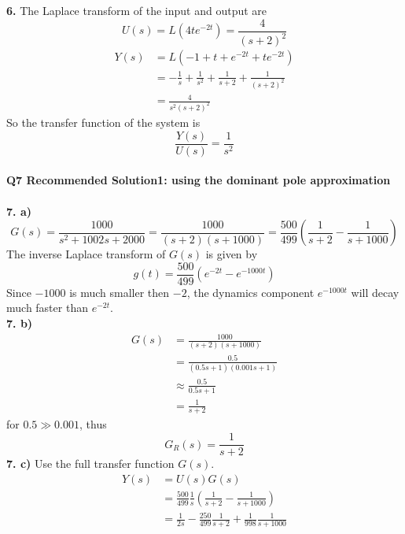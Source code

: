 \documentclass[11pt, a4paper]{article}
\begin{document}
\\
\\
\textbf{6.} The Laplace transform of the input and output are 
\begin{equation*}
U(s) = L(4te^{-2t}) = \frac{4}{(s+2)^2} 
\end{equation*}
\begin{equation*}
\begin{split}
Y(s) &= L(-1 + t + e^{-2t} + te^{-2t})\\
     &= -\frac{1}{s} + \frac{1}{s^2} + \frac{1}{s+2} + \frac{1}{(s+2)^2}\\
     &= \frac{4}{s^2(s+2)^2}
\end{split}
\end{equation*}
So the transfer function of the system is 
\begin{equation*}
\frac{Y(s)}{U(s)} = \frac{1}{s^2}
\end{equation*}
\\
\textbf{Q7 Recommended Solution1: using the dominant pole approximation}\\
\\
\textbf{7. a)}
\begin{equation*}
G(s) = \frac{1000}{s^2 + 1002s + 2000} = \frac{1000}{(s+2)(s+1000)} = \frac{500}{499}(\frac{1}{s+2} - \frac{1}{s+1000})
\end{equation*}
The inverse Laplace transform of $G(s)$ is given by
\begin{equation*}
g(t) = \frac{500}{499}(e^{-2t} - e^{-1000t})
\end{equation*}
Since $-1000$ is much smaller then $-2$, the dynamics component $e^{-1000t}$ will decay much faster than $e^{-2t}$.
\\
\textbf{7. b)}
\begin{equation*}
\begin{split}
G(s) &= \frac{1000}{(s+2)(s+1000)}\\
     &= \frac{0.5}{(0.5s+1)(0.001s+1)}\\
     &\approx \frac{0.5}{0.5s+1}\\
     &= \frac{1}{s+2}
\end{split}
\end{equation*}
for $0.5\gg0.001$, thus
\begin{equation*}
G_R(s) = \frac{1}{s+2}
\end{equation*}
\textbf{7. c)} Use the full transfer function $G(s)$.
\begin{equation*}
\begin{split}
Y(s) &= U(s)G(s) \\
     &= \frac{500}{499}\frac{1}{s}(\frac{1}{s+2} - \frac{1}{s+1000})\\
     &= \frac{1}{2s} - \frac{250}{499}\frac{1}{s+2} + \frac{1}{998}\frac{1}{s+1000}
\end{split}
\end{equation*}
\end{document}
